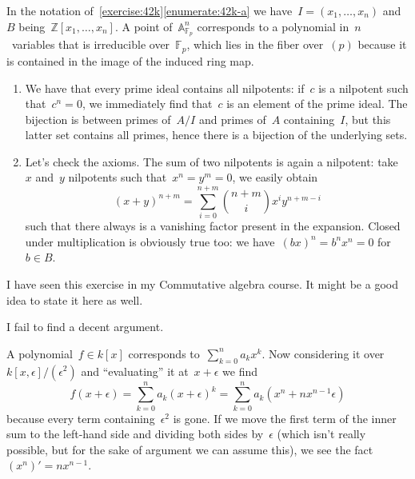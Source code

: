 \begin{exercise} %
  In the notation of~\autoref{exercise:42k}\ref{enumerate:42k-a} we have~$I=(x_1,\ldots,x_n)$ and~$B$ being~$\mathbb{Z}[x_1,\ldots,x_n]$. A point of~$\mathbb{A}_{\mathbb{F}_p}^n$ corresponds to a polynomial in~$n$~variables that is irreducible over~$\mathbb{F}_p$, which lies in the fiber over~$(p)$ because it is contained in the image of the induced ring map.
\end{exercise}

\begin{exercise}
  \label{exercise:42o}
  \begin{enumerate}
    \item We have that every prime ideal contains all nilpotents: if~$c$ is a nilpotent such that~$c^n=0$, we immediately find that~$c$ is an element of the prime ideal. The bijection is between primes of~$A/I$ and primes of~$A$ containing~$I$, but this latter set contains all primes, hence there is a bijection of the underlying sets.

    \item\label{enumerate:42o-b} Let's check the axioms. The sum of two nilpotents is again a nilpotent: take~$x$ and~$y$ nilpotents such that~$x^n=y^m=0$, we easily obtain
      \begin{equation}
        (x+y)^{n+m}=\sum_{i=0}^{n+m}\binom{n+m}{i}x^iy^{n+m-i}
      \end{equation}
      such that there always is a vanishing factor present in the expansion. Closed under multiplication is obviously true too: we have~$(bx)^n=b^nx^n=0$ for~$b\in B$.
  \end{enumerate}
\end{exercise}

\begin{exercise} %
  I have seen this exercise in my Commutative algebra course. It might be a good idea to state it here as well.
\end{exercise}

\begin{exercise} %
  I fail to find a decent argument.
\end{exercise}

\begin{exercise}
  A polynomial~$f\in k[x]$ corresponds to~$\sum_{k=0}^na_kx^k$. Now considering it over~$k[x,\epsilon]/(\epsilon^2)$ and ``evaluating'' it at~$x+\epsilon$ we find
  \begin{equation}
    f(x+\epsilon)=\sum_{k=0}^na_k(x+\epsilon)^k=\sum_{k=0}^na_k\left( x^n+nx^{n-1}\epsilon \right)
  \end{equation}
  because every term containing~$\epsilon^2$ is gone. If we move the first term of the inner sum to the left-hand side and dividing both sides by~$\epsilon$ (which isn't really possible, but for the sake of argument we can assume this), we see the fact~$(x^n)'=nx^{n-1}$.
\end{exercise}


